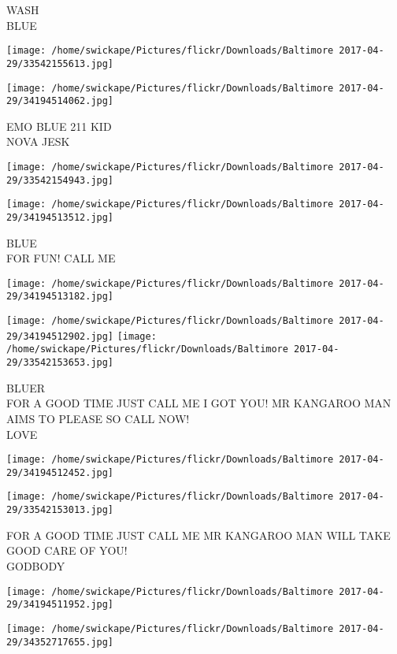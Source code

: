 \documentclass[10pt,letterpaper]{article}
\begin{document}
WASH\\
BLUE
\pagebreak

\texttt{[image: /home/swickape/Pictures/flickr/Downloads/Baltimore 2017-04-29/33542155613.jpg]}

\vspace{0.25in}
\texttt{[image: /home/swickape/Pictures/flickr/Downloads/Baltimore 2017-04-29/34194514062.jpg]}

EMO BLUE 211 KID\\
NOVA JESK
\pagebreak

\texttt{[image: /home/swickape/Pictures/flickr/Downloads/Baltimore 2017-04-29/33542154943.jpg]}

\vspace{0.25in}
\texttt{[image: /home/swickape/Pictures/flickr/Downloads/Baltimore 2017-04-29/34194513512.jpg]}

BLUE\\
FOR FUN!  CALL ME
\pagebreak

\texttt{[image: /home/swickape/Pictures/flickr/Downloads/Baltimore 2017-04-29/34194513182.jpg]}

\vspace{0.25in}
\texttt{[image: /home/swickape/Pictures/flickr/Downloads/Baltimore 2017-04-29/34194512902.jpg]}
\texttt{[image: /home/swickape/Pictures/flickr/Downloads/Baltimore 2017-04-29/33542153653.jpg]}

BLUER\\
FOR A GOOD TIME JUST CALL ME I GOT YOU!  MR KANGAROO MAN AIMS TO PLEASE SO CALL NOW!\\
LOVE
\pagebreak

\texttt{[image: /home/swickape/Pictures/flickr/Downloads/Baltimore 2017-04-29/34194512452.jpg]}

\vspace{0.25in}
\texttt{[image: /home/swickape/Pictures/flickr/Downloads/Baltimore 2017-04-29/33542153013.jpg]}

FOR A GOOD TIME JUST CALL ME MR KANGAROO MAN WILL TAKE GOOD CARE OF YOU!\\
GODBODY
\pagebreak

\texttt{[image: /home/swickape/Pictures/flickr/Downloads/Baltimore 2017-04-29/34194511952.jpg]}

\vspace{0.25in}
\texttt{[image: /home/swickape/Pictures/flickr/Downloads/Baltimore 2017-04-29/34352717655.jpg]}
\end{document}
